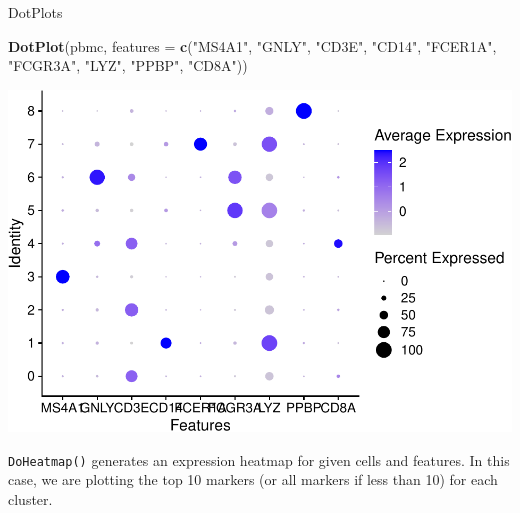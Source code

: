 \documentclass[
]{book}
\newenvironment{Shaded}{\begin{snugshade}}{\end{snugshade}}
\newcommand{\AttributeTok}[1]{\textcolor[rgb]{0.13,0.29,0.53}{#1}}
\newcommand{\DecValTok}[1]{\textcolor[rgb]{0.00,0.00,0.81}{#1}}
\newcommand{\FunctionTok}[1]{\textcolor[rgb]{0.13,0.29,0.53}{\textbf{#1}}}
\newcommand{\NormalTok}[1]{#1}
\newcommand{\OtherTok}[1]{\textcolor[rgb]{0.56,0.35,0.01}{#1}}
\newcommand{\SpecialCharTok}[1]{\textcolor[rgb]{0.81,0.36,0.00}{\textbf{#1}}}
\newcommand{\StringTok}[1]{\textcolor[rgb]{0.31,0.60,0.02}{#1}}
\begin{document}
DotPlots

\begin{Shaded}
\begin{Highlighting}[]
\FunctionTok{DotPlot}\NormalTok{(pbmc, }\AttributeTok{features =} \FunctionTok{c}\NormalTok{(}\StringTok{"MS4A1"}\NormalTok{, }\StringTok{"GNLY"}\NormalTok{, }\StringTok{"CD3E"}\NormalTok{, }\StringTok{"CD14"}\NormalTok{, }\StringTok{"FCER1A"}\NormalTok{, }\StringTok{"FCGR3A"}\NormalTok{, }\StringTok{"LYZ"}\NormalTok{, }\StringTok{"PPBP"}\NormalTok{, }\StringTok{"CD8A"}\NormalTok{))}
\end{Highlighting}
\end{Shaded}

\includegraphics{scRNAseqInR_Doco_files/figure-latex/unnamed-chunk-31-1.pdf}

\texttt{DoHeatmap()} generates an expression heatmap for given cells and features. In this case, we are plotting the top 10 markers (or all markers if less than 10) for each cluster.

\begin{Shaded}
\end{Shaded}
\end{document}
